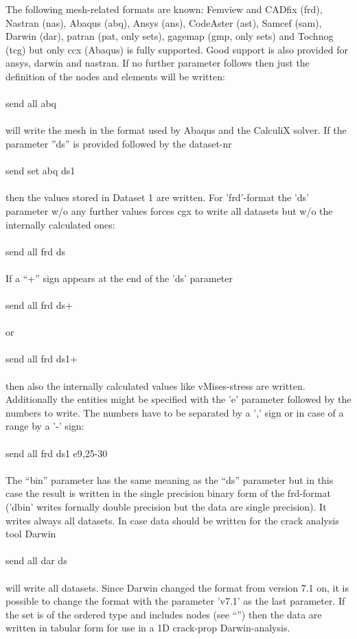 \documentclass{article}
\begin{document}
The following mesh-related formats are known: Femview and CADfix (frd), Nastran (nas), Abaqus (abq), Ansys (ans), CodeAster (ast), Samcef (sam), Darwin (dar), patran (pat, only sets), gagemap (gmp, only sets) and Tochnog (tcg) but only ccx (Abaqus) is fully supported. Good support is also provided for ansys, darwin and nastran. If no further parameter follows then just the definition of the nodes and elements will be written:\\\\send all abq\\\\will write the mesh in the format used by Abaqus and the CalculiX solver. If the parameter ''ds'' is provided followed by the dataset-nr\\\\send set abq ds1\\\\then the values stored in Dataset 1 are written. For 'frd'-format the 'ds' parameter w/o any further values forces cgx to write all datasets but w/o the internally calculated ones:\\\\send all frd ds\\\\If a ``+'' sign appears at the end of the 'ds' parameter\\\\send all frd ds+\\\\or \\\\send all frd ds1+\\\\then also the internally calculated values like vMises-stress are written. Additionally the entities might be specified with the 'e' parameter followed by the numbers to write. The numbers have to be separated by a ',' sign or in case of a range by a '-' sign:\\\\send all frd ds1 e9,25-30\\\\ The ``bin'' parameter has the same meaning as the ``ds'' parameter but in this case the result is written in the single precision binary form of the frd-format ('dbin' writes formally double precision but the data are single precision). It writes always all datasets. In case data should be written for the crack analysis tool Darwin\\\\send all dar ds\\\\will write all datasets. Since Darwin changed the format from version 7.1 on, it is possible to change the format with the parameter 'v7.1' as the last parameter. If the set is of the ordered type and includes nodes (see ``'') then the data are written in tabular form for use in a 1D crack-prop Darwin-analysis.
\end{document}
